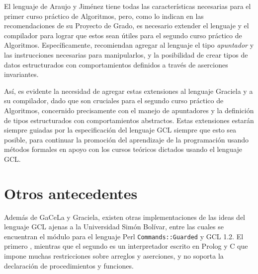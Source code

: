 El lenguaje de Araujo y Jiménez tiene todas las características necesarias para
el primer curso práctico de Algoritmos, pero, como lo indican en las
recomendaciones de su Proyecto de Grado, es necesario extender el lenguaje y el
compilador para lograr que estos sean útiles para el segundo curso práctico de
Algoritmos. Específicamente, recomiendan agregar al lenguaje el tipo
\textit{apuntador} y las instrucciones necesarias para manipularlos, y la
posibilidad de crear tipos de datos estructurados con comportamientos definidos
a través de aserciones invariantes.

Así, es evidente la necesidad de agregar estas extensiones al lenguaje Graciela
y a su compilador, dado que son cruciales para el segundo curso práctico de
Algoritmos, concernido precisamente con el manejo de apuntadores y la definición
de tipos estructurados con comportamientos abstractos. Estas extensiones estarán
siempre guiadas por la especificación del lenguaje GCL siempre que esto sea
posible, para continuar la promoción del aprendizaje de la programación usando
métodos formales en apoyo con los cursos teóricos dictados usando el lenguaje
GCL.


\section*{Otros antecedentes}

Además de GaCeLa y Graciela, existen otras implementaciones de las ideas del
lenguaje GCL ajenas a la Universidad Simón Bolívar, entre las cuales se
encuentran el módulo para el lenguaje Perl \texttt{Commands::Guarded} y GCL 1.2.
El primero , mientras que el segundo es
un interpretador escrito en Prolog y C que impone muchas restricciones sobre
arreglos y aserciones, y no soporta la declaración de procedimientos y
funciones.

